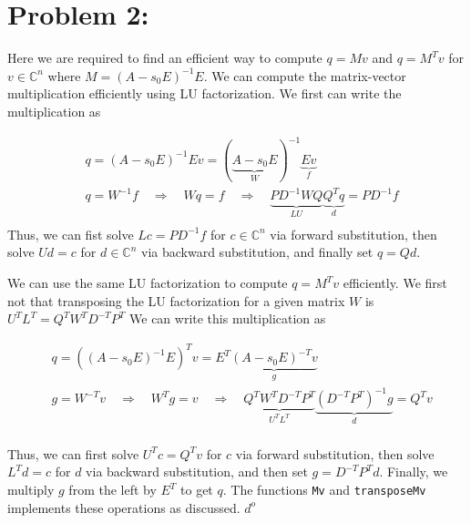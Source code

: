 \section*{Problem 2:}
Here we are required to find an efficient way to compute $q = Mv$ and $q = M^{T}v$ for $v \in \mathbb{C}^{n}$ where $M = (A - s_{0}E)^{-1}E$. We can compute the matrix-vector multiplication efficiently using LU factorization. We first can write the multiplication as

\begin{align*}
& q = (A-s_{0}E)^{-1}Ev = (\underbrace{A-s_{0}E}_{W})^{-1}\underbrace{Ev}_{f} \\
& q = W^{-1} f \quad \Rightarrow \quad Wq = f \quad \Rightarrow \quad \underbrace{PD^{-1}WQ}_{LU}\underbrace{Q^{T}q}_{d} = PD^{-1}f \\
\end{align*}
Thus, we can fist solve $Lc = PD^{-1}f$ for $c \in \mathbb{C}^{n}$ via forward substitution, then solve $Ud = c$ for $d \in \mathbb{C}^{n}$ via backward substitution, and finally set $q = Qd$. 

We can use the same LU factorization to compute $q = M^{T}v$ efficiently. We first not that transposing the LU factorization for a given matrix $W$ is $U^{T}L^{T} = Q^{T}W^{T}D^{-T}P^{T}$
 We can write this multiplication as 

\begin{align*}
& q = ((A-s_{0}E)^{-1}E)^{T}v = E^{T}\underbrace{(A-s_{0}E)^{-T}v}_{g}\\
& g = W^{-T} v \quad \Rightarrow \quad W^{T}g = v \quad \Rightarrow \quad \underbrace{Q^{T}W^{T}D^{-T}P^{T}}_{U^{T}L^{T}}\underbrace{(D^{-T}P^{T})^{-1}g}_{d}=Q^{T}v\\
\end{align*}

Thus, we can first solve $U^{T}c = Q^{T}v$ for $c$ via forward substitution, then solve $L^{T}d = c$ for $d$ via backward substitution, and then set $g = D^{-T}P^{T}d$. Finally, we multiply $g$ from the left by $E^{T}$ to get $q$. The functions \texttt{Mv} and \texttt{transposeMv} implements these operations as discussed.  $d^{o}$